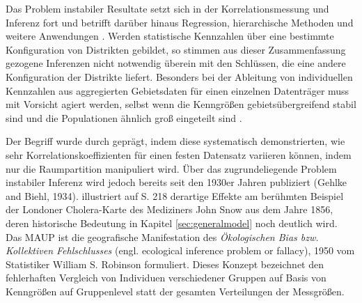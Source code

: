 Das Problem instabiler Resultate setzt sich in der Korrelationsmessung und Inferenz fort und betrifft darüber hinaus Regression, hierarchische Methoden 
und weitere Anwendungen \cite[S.106]{waller_applied_2004}.
Werden statistische Kennzahlen über eine bestimmte Konfiguration von Distrikten gebildet, 
so stimmen aus dieser Zusammenfassung gezogene Inferenzen nicht notwendig überein mit den Schlüssen, die eine andere Konfiguration der Distrikte liefert.
Besonders bei der Ableitung von individuellen Kennzahlen aus aggregierten Gebietsdaten für einen einzelnen Datenträger muss mit Vorsicht agiert werden, 
selbst wenn die Kenngrößen gebietsübergreifend stabil sind und die Populationen ähnlich groß eingeteilt sind \cite[S.104]{waller_applied_2004}.

Der Begriff wurde durch \cite{openshaw_statistical_1979} geprägt, indem diese systematisch demonstrierten, 
wie sehr Korrelationskoeffizienten für einen festen Datensatz variieren können, indem nur die Raumpartition manipuliert wird.
Über das zugrundeliegende Problem instabiler Inferenz wird jedoch bereits seit den 1930er Jahren publiziert (Gehlke and Biehl, 1934). 
\cite{monmonier_eins_2013} illustriert auf S. 218 derartige Effekte am berühmten Beispiel der Londoner Cholera-Karte des Mediziners John Snow aus dem Jahre 1856, deren 
historische Bedeutung in Kapitel \ref{sec:generalmodel} noch deutlich wird. \\


Das MAUP ist die geografische Manifestation des \emph{Ökologischen Bias bzw. Kollektiven Fehlschlusses} (engl. ecological inference problem or fallacy), 
1950 vom Statistiker William S. Robinson formuliert. 
Dieses Konzept bezeichnet den fehlerhaften Vergleich von Individuen verschiedener Gruppen auf Basis von Kenngrößen auf Gruppenlevel statt der gesamten Verteilungen der Messgrößen.




